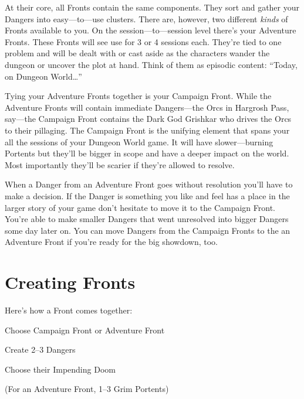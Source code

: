 At their core, all Fronts contain the same components. They sort and gather your Dangers into easy—to—use clusters. There are, however, two different {\em kinds}  of Fronts available to you. On the session—to—session level there’s your Adventure Fronts. These Fronts will see use for 3 or 4 sessions each. They’re tied to one problem and will be dealt with or cast aside as the characters wander the dungeon or uncover the plot at hand. Think of them as episodic content: “Today, on Dungeon World…”

       

Tying your Adventure Fronts together is your Campaign Front. While the Adventure Fronts will contain immediate Dangers—the Orcs in Hargrosh Pass, say—the Campaign Front contains the Dark God Grishkar who drives the Orcs to their pillaging. The Campaign Front is the unifying element that spans your all the sessions of your Dungeon World game. It will have slower—burning Portents but they’ll be bigger in scope and have a deeper impact on the world. Most importantly they'll be scarier if they're allowed to resolve.

       

When a Danger from an Adventure Front goes without resolution you’ll have to make a decision. If the Danger is something you like and feel has a place in the larger story of your game don’t hesitate to move it to the Campaign Front. You’re able to make smaller Dangers that went unresolved into bigger Dangers some day later on. You can move Dangers from the Campaign Fronts to the an Adventure Front if you’re ready for the big showdown, too.

       
\section{Creating Fronts}   
       

Here’s how a Front comes together:

       
\startitemize[1,packed]
         
\item Choose Campaign Front or Adventure Front

         
\item Create 2–3 Dangers

         
\item Choose their Impending Doom

         
\item (For an Adventure Front, 1–3 Grim Portents)

